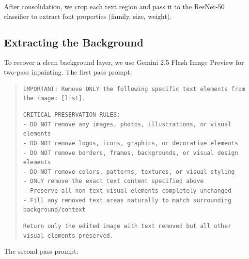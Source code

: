 \documentclass{article}
\begin{document}
After consolidation, we crop each text region and pass it to the ResNet-50 classifier to extract
font properties (family, size, weight).

\subsection{Extracting the Background}

To recover a clean background layer, we use Gemini 2.5 Flash Image Preview for two-pass inpainting.
The first pass prompt:

\begin{quote}
\small
\texttt{IMPORTANT: Remove ONLY the following specific text elements from the image: [list].}

\texttt{CRITICAL PRESERVATION RULES:}\\
\texttt{- DO NOT remove any images, photos, illustrations, or visual elements}\\
\texttt{- DO NOT remove logos, icons, graphics, or decorative elements}\\
\texttt{- DO NOT remove borders, frames, backgrounds, or visual design elements}\\
\texttt{- DO NOT remove colors, patterns, textures, or visual styling}\\
\texttt{- ONLY remove the exact text content specified above}\\
\texttt{- Preserve all non-text visual elements completely unchanged}\\
\texttt{- Fill any removed text areas naturally to match surrounding background/context}

\texttt{Return only the edited image with text removed but all other visual elements preserved.}
\end{quote}

The second pass prompt:
\end{document}
